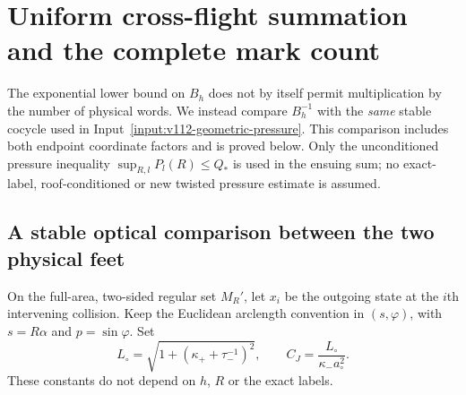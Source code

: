 \section{Uniform cross-flight summation and the complete mark count}
\label{sec:xf-pressure}
The exponential lower bound on $B_h$ does not by itself permit
multiplication by the number of physical words. We instead compare
$B_h^{-1}$ with the \emph{same} stable cocycle used in
Input~\ref{input:v112-geometric-pressure}. This comparison includes
both endpoint coordinate factors and is proved below. Only the
unconditioned pressure inequality $\sup_{R,l}P_l(R)\le Q_*$ is
used in the ensuing sum; no exact-label, roof-conditioned or new
twisted pressure estimate is assumed.

\subsection{A stable optical comparison between the two physical feet}
On the full-area, two-sided regular set $M_R'$, let $x_i$ be the
outgoing state at the $i$th intervening collision. Keep the Euclidean
arclength convention in $(s,\varphi)$, with $s=R\alpha$ and
$p=\sin\varphi$. Set
\begin{equation}\label{eq:xf-comparison-constant}
 L_\circ=\sqrt{1+(\kappa_++\tau_-^{-1})^2},\qquad
 C_J=\frac{L_\circ}{\kappa_-a_\circ^2}.
\end{equation}
These constants do not depend on $h$, $R$ or the exact labels.

